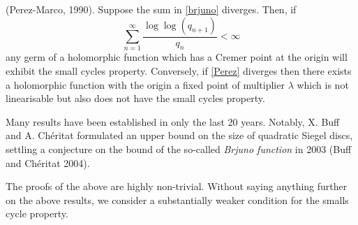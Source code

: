 \documentclass[../main.tex]{subfiles}
\begin{document}
\begin{thm}(Perez-Marco, 1990).
Suppose the sum in \eqref{brjuno} diverges. Then, if
\begin{equation}\label{Perez}
     \sum_{n = 1}^{\infty} \frac{\log{\log{(q_{n+1})}}}{q_n} < \infty
\end{equation}
any germ of a holomorphic function which has a Cremer point at the origin will exhibit the small cycles property. Conversely, if \eqref{Perez} diverges then there exists a holomorphic function with the origin a fixed point of multiplier $\lambda$ which is not linearisable but also does not have the small cycles property.
\end{thm}

Many results have been established in only the last 20 years. Notably, X. Buff and A. Ch\'eritat formulated an upper bound on the size of quadratic Siegel discs, settling a conjecture on the bound of the so-called \textit{Brjuno function} in 2003 (Buff and Ch\'eritat 2004).

The proofs of the above are highly non-trivial. Without saying anything further on the above results, we consider a substantially weaker condition for the smalls cycle property.
\end{document}

